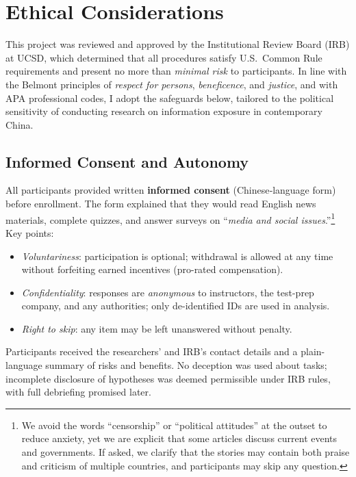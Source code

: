 \documentclass[12pt, american]{article}
\begin{document}
\section{Ethical Considerations}

\noindent
This project was reviewed and approved by the Institutional Review Board (IRB) at UCSD, which determined that all procedures satisfy U.S.\ Common Rule requirements and present no more than \emph{minimal risk} to participants.  In line with the Belmont principles of \textit{respect for persons}, \textit{beneficence}, and \textit{justice}, and with APA professional codes, I adopt the safeguards below, tailored to the political sensitivity of conducting research on information exposure in contemporary China.

\subsection{Informed Consent and Autonomy}
All participants provided written \textbf{informed consent} (Chinese‐language form) before enrollment.  The form explained that they would read English news materials, complete quizzes, and answer surveys on “\emph{media and social issues}.”\footnote{We avoid the words “censorship” or “political attitudes” at the outset to reduce anxiety, yet we are explicit that some articles discuss current events and governments. If asked, we clarify that the stories may contain both praise and criticism of multiple countries, and participants may skip any question.} Key points:

\begin{itemize}[leftmargin=*]
  \item \emph{Voluntariness}: participation is optional; withdrawal is allowed at any time without forfeiting earned incentives (pro-rated compensation).  
  \item \emph{Confidentiality}: responses are \textit{anonymous} to instructors, the test-prep company, and any authorities; only de-identified IDs are used in analysis.  
  \item \emph{Right to skip}: any item may be left unanswered without penalty.  
\end{itemize}

Participants received the researchers’ and IRB’s contact details and a plain-language summary of risks and benefits.  No deception was used about tasks; incomplete disclosure of hypotheses was deemed permissible under IRB rules, with full debriefing promised later.
\end{document}
